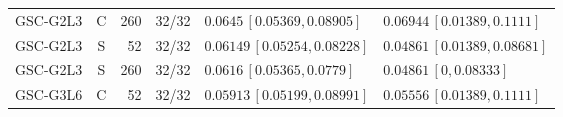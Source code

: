 \documentclass[10pt,a4paper]{article}
\begin{document}
\begin{longtable}{lcrcp{44mm}p{44mm}}
GSC-G2L3 & C & 260 & 32/32 & \(0.0645\,[0.05369,0.08905]\) & \(0.06944\,[0.01389,0.1111]\)\\
GSC-G2L3 & S & 52 & 32/32 & \(0.06149\,[0.05254,0.08228]\) & \(0.04861\,[0.01389,0.08681]\)\\
GSC-G2L3 & S & 260 & 32/32 & \(0.0616\,[0.05365,0.0779]\) & \(0.04861\,[0,0.08333]\)\\
GSC-G3L6 & C & 52 & 32/32 & \(0.05913\,[0.05199,0.08991]\) & \(0.05556\,[0.01389,0.1111]\)\\

\end{longtable}
\end{document}
